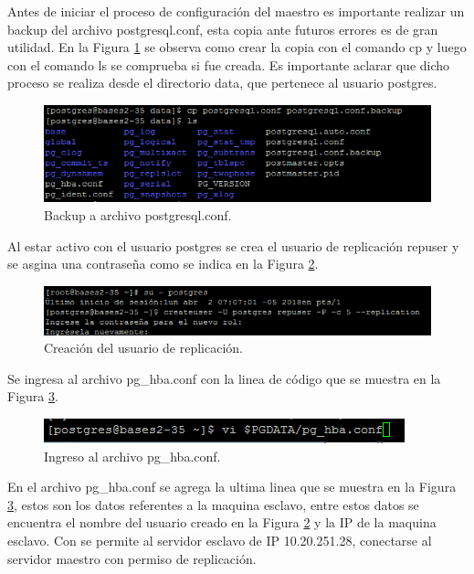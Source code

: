 Antes de iniciar el proceso de configuración del maestro es importante realizar un backup del archivo postgresql.conf, esta copia ante futuros errores es de gran utilidad. En la Figura \ref{fig:3} se observa como crear la copia con el comando cp y luego con el comando ls se comprueba si fue creada. Es importante aclarar que dicho proceso se realiza desde el directorio data, que pertenece al usuario postgres. 

\begin{figure}[H]
\centering
\includegraphics[width=\columnwidth]{eRelatedWorks/src/3}
\caption{Backup a archivo postgresql.conf. }\label{fig:3}
\end{figure}

Al estar activo con el usuario postgres se crea el usuario de replicación repuser y se asgina una contraseña como se indica en la Figura \ref{fig:4}.

\begin{figure}[H]
\centering
\includegraphics[width=\columnwidth]{eRelatedWorks/src/4}
\caption{Creación del usuario de replicación. }\label{fig:4}
\end{figure}

Se ingresa al archivo pg\_hba.conf con la linea de código que se muestra en la Figura \ref{fig:5}.

\begin{figure}[H]
\centering
\includegraphics[width=\columnwidth]{eRelatedWorks/src/5}
\caption{Ingreso al archivo pg\_hba.conf. }\label{fig:5}
\end{figure}

En el archivo pg\_hba.conf se agrega la ultima linea que se muestra en la Figura \ref{fig:5}, estos son los datos referentes a la maquina esclavo, entre estos datos se encuentra el nombre del usuario creado en la Figura \ref{fig:4} y la IP de la maquina esclavo. Con se permite al servidor esclavo de IP 10.20.251.28, conectarse al servidor maestro con permiso de replicación.

